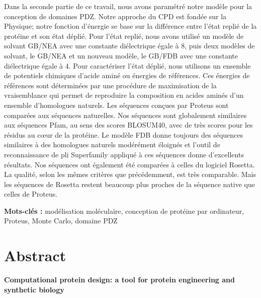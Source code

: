 Dans la seconde partie de ce travail, nous avons paramétré notre modèle pour la conception de domaines PDZ. Notre approche du CPD est fondée sur la Physique; notre fonction d’énergie se base sur la différence entre l’état replié de la protéine et son état déplié. Pour l’état replié, nous avons utilisé un modèle de solvant GB/NEA avec une constante diélectrique égale à 8, puis  deux modèles de solvant, le GB/NEA et un nouveau modèle, le GB/FDB avec une constante diélectrique égale à 4. Pour caractériser l’état déplié, nous utilisons un ensemble de potentiels chimiques d’acide aminé ou énergies de références. Ces énergies de références sont déterminées par une procédure de maximisation de la vraisemblance qui permet de reproduire la composition en acides aminés d’un ensemble d’homologues naturels. Les séquences conçues par Proteus sont comparées aux séquences naturelles. Nos séquences sont globalement similaires aux séquences Pfam, au sens des scores BLOSUM40, avec de très scores pour les résidus au cœur de la protéine. Le modèle FDB donne toujours des séquences similaires à des homologues naturels modérément éloignés et l’outil de reconnaissance de pli Superfamily appliqué à ces séquences donne d’excellents résultats. Nos séquences ont également été comparées à celles du logiciel Rosetta. La qualité, selon les mêmes critères que précédemment, est très comparable. Mais les séquences de Rosetta restent beaucoup plus proches de la séquence native que celles de Proteus.   


\bigskip

\textbf{Mots-clés :} modélisation moléculaire, conception de protéine par ordinateur, Proteus, Monte Carlo, domaine PDZ

\vfill



\section*{Abstract}

{\large\bf\noindent Computational protein design: a tool for protein engineering and synthetic biology}

\bigskip


